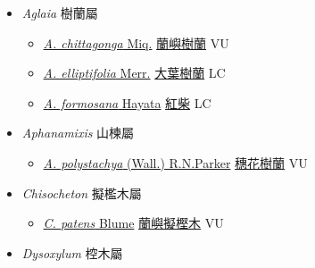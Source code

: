 
  \begin{itemize}
 \item[] \textit{Aglaia} 樹蘭屬
                    
  \begin{itemize}
        \item[] \href{http://www.theplantlist.org/tpl1.1/search?q=Aglaia+chittagonga}{\textit{A. chittagonga} Miq.}   \href{\detokenize{http://taibnet.sinica.edu.tw/chi/taibnet_species_list.php?T2=蘭嶼樹蘭&T2_new_value=true&fr=y}}{蘭嶼樹蘭} VU
        \item[] \href{http://www.theplantlist.org/tpl1.1/search?q=Aglaia+elliptifolia}{\textit{A. elliptifolia} Merr.}   \href{\detokenize{http://taibnet.sinica.edu.tw/chi/taibnet_species_list.php?T2=大葉樹蘭&T2_new_value=true&fr=y}}{大葉樹蘭} LC
        \item[] \href{http://www.theplantlist.org/tpl1.1/search?q=Aglaia+formosana}{\textit{A. formosana} Hayata}   \href{\detokenize{http://taibnet.sinica.edu.tw/chi/taibnet_species_list.php?T2=紅柴&T2_new_value=true&fr=y}}{紅柴} LC
  \end{itemize}
 \item[] \textit{Aphanamixis} 山楝屬
                    
  \begin{itemize}
        \item[] \href{http://www.theplantlist.org/tpl1.1/search?q=Aphanamixis+polystachya}{\textit{A. polystachya} (Wall.) R.N.Parker}   \href{\detokenize{http://taibnet.sinica.edu.tw/chi/taibnet_species_list.php?T2=穗花樹蘭&T2_new_value=true&fr=y}}{穗花樹蘭} VU
  \end{itemize}
 \item[] \textit{Chisocheton} 擬檻木屬
                    
  \begin{itemize}
        \item[] \href{http://www.theplantlist.org/tpl1.1/search?q=Chisocheton+patens}{\textit{C. patens} Blume}   \href{\detokenize{http://taibnet.sinica.edu.tw/chi/taibnet_species_list.php?T2=蘭嶼擬樫木&T2_new_value=true&fr=y}}{蘭嶼擬樫木} VU
  \end{itemize}
 \item[] \textit{Dysoxylum} 椌木屬
                    

\end{itemize}
